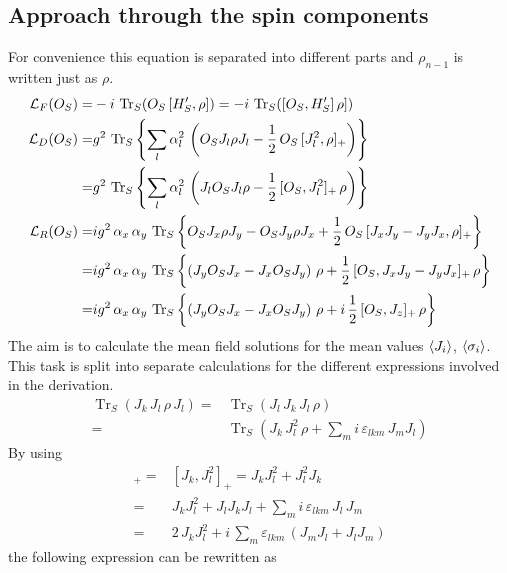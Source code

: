 \documentclass{article}
\begin{document}
\subsection*{Approach through the spin components}
For convenience this equation is separated into different parts and $\rho_{n-1}$ is written just as $\rho$.
\begin{align*}
    \mathcal{L}_F(O_S)=&-i\,\operatorname{Tr}_S(O_S\,[H_S',\rho])=-i\,\operatorname{Tr}_S([O_S,H_S']\,\rho])\\
    \mathcal{L}_D(O_S)=&g^2\,\operatorname{Tr}_S\left\{\sum_l\alpha_l^2\,\left(O_S J_l \rho J_l-\frac{1}{2}\,O_S\,[J_l^2,\rho]_+\right)\right\}\\
    =&g^2\,\operatorname{Tr}_S\left\{\sum_l\alpha_l^2\,\left(J_l O_S J_l \rho-\frac{1}{2}\,[O_S,J_l^2]_+\,\rho\right)\right\}\\
    \mathcal{L}_{R}(O_S)=&ig^2\,\alpha_x\,\alpha_y\,\operatorname{Tr}_S\left\{O_S J_x \rho J_y-O_S J_y \rho J_x+\frac{1}{2}\,O_S\,[J_x J_y-J_y J_x,\rho]_+\right\}\\
    =&ig^2\,\alpha_x\,\alpha_y\,\operatorname{Tr}_S\left\{\left(J_y O_S J_x-J_x O_S J_y\right)\,\rho+\frac{1}{2}\,[O_S,J_x J_y-J_y J_x]_+\,\rho\right\}\\
    =&ig^2\,\alpha_x\,\alpha_y\,\operatorname{Tr}_S\left\{\left(J_y O_S J_x-J_x O_S J_y\right)\,\rho+i\,\frac{1}{2}\,[O_S,J_z]_+\,\rho\right\}
\end{align*}
The aim is to calculate the mean field solutions for the mean values $\braket{J_i}$, $\braket{\sigma_i}$. This task is split into separate calculations for the different expressions involved in the derivation. 
\begin{align*}
    \operatorname{Tr}_S\left(J_k\,J_l\,\rho\,J_l\right)=&\operatorname{Tr}_S\left(J_l\,J_k\,J_l\,\rho\right)\\
    =&\operatorname{Tr}_S\left(J_k\,J_l^2\,\rho+\sum_mi\,\varepsilon_{lkm}\,J_m J_l\right)
\end{align*}
By using
\begin{align*}
    [J_l^2,J_k]_+=&[J_k,J_l^2]_+ =J_k J_l^2 + J_l^2 J_k\\
    =& J_k J_l^2 + J_l J_k J_l + \sum_mi\,\varepsilon_{lkm}\,J_l\,J_m\\
    =&2\,J_k J_l^2 + i\,\sum_m\varepsilon_{lkm}\,(J_m J_l + J_l J_m)
\end{align*}
the following expression can be rewritten as
\end{document}
